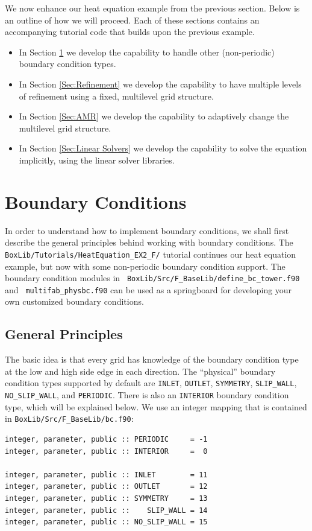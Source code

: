 We now enhance our heat equation example from the previous section.
Below is an outline of how we will proceed.  Each of these sections contains an 
accompanying tutorial code that builds upon the previous example.
\begin{itemize}

\item In Section \ref{Sec:Boundary Conditions} we develop the
  capability to handle other (non-periodic) boundary condition types.

\item In Section \ref{Sec:Refinement} we develop the capability to
  have multiple levels of refinement using a fixed, multilevel grid
  structure.

\item In Section \ref{Sec:AMR} we develop the capability to adaptively
  change the multilevel grid structure.

\item In Section \ref{Sec:Linear Solvers} we develop the capability to
  solve the equation implicitly, using the linear solver libraries.

\end{itemize}

\section{Boundary Conditions}\label{Sec:Boundary Conditions}
In order to understand how to implement boundary conditions, we shall
first describe the general principles behind working with boundary
conditions.  The {\tt BoxLib/Tutorials/HeatEquation\_EX2\_F/} tutorial
continues our heat equation example, but now with some non-periodic
boundary condition support.  The boundary condition modules in {\tt
  BoxLib/Src/F\_BaseLib/define\_bc\_tower.f90} and {\tt
  multifab\_physbc.f90} can be used as a springboard for developing
your own customized boundary conditions.

\subsection{General Principles}
The basic idea is that every grid has knowledge of the
boundary condition type at the low and high side edge in each direction.
The ``physical'' boundary condition types supported by default are {\tt INLET}, {\tt OUTLET},
{\tt SYMMETRY}, {\tt SLIP\_WALL}, {\tt NO\_SLIP\_WALL}, and {\tt PERIODIC}.
There is also an {\tt INTERIOR} boundary condition type, which 
will be explained below.  We use an integer mapping that is 
contained in {\tt BoxLib/Src/F\_BaseLib/bc.f90}:
\begin{lstlisting}[backgroundcolor=\color{light-green}]
integer, parameter, public :: PERIODIC     = -1
integer, parameter, public :: INTERIOR     =  0

integer, parameter, public :: INLET        = 11
integer, parameter, public :: OUTLET       = 12
integer, parameter, public :: SYMMETRY     = 13
integer, parameter, public ::    SLIP_WALL = 14
integer, parameter, public :: NO_SLIP_WALL = 15
\end{lstlisting}

